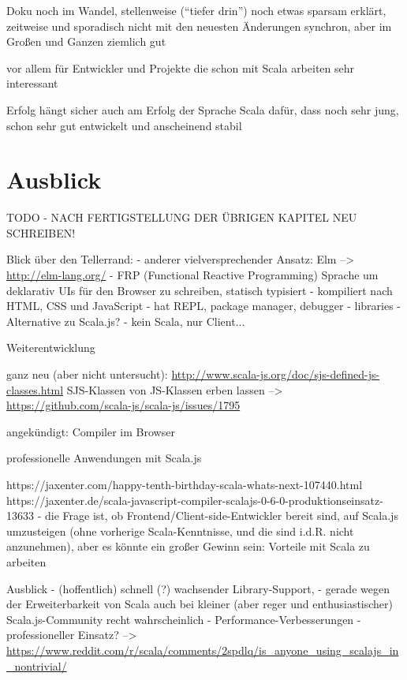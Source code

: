 \documentclass[a4paper, 12pt, hidelinks, listof=totoc, listoftables=totoc, bibliography=totoc]{scrreprt}
\begin{document}
Doku noch im Wandel, stellenweise ("`tiefer drin"') noch etwas sparsam erklärt, zeitweise und sporadisch nicht mit den neuesten Änderungen synchron, aber im Großen und Ganzen ziemlich gut

vor allem für Entwickler und Projekte die schon mit Scala arbeiten sehr interessant

Erfolg hängt sicher auch am Erfolg der Sprache Scala
dafür, dass noch sehr jung, schon sehr gut entwickelt und anscheinend stabil





\section{Ausblick}

TODO - NACH FERTIGSTELLUNG DER ÜBRIGEN KAPITEL NEU SCHREIBEN!

Blick über den Tellerrand:
- anderer vielversprechender Ansatz: Elm
	-->  \url{http://elm-lang.org/}
	- FRP (Functional Reactive Programming) Sprache um deklarativ UIs für den Browser zu schreiben, statisch typisiert
	- kompiliert nach HTML, CSS und JavaScript
	- hat REPL, package manager, debugger
	- libraries
	- Alternative zu Scala.js? - kein Scala, nur Client...



Weiterentwicklung

	ganz neu (aber nicht untersucht): \url{http://www.scala-js.org/doc/sjs-defined-js-classes.html}
	SJS-Klassen von JS-Klassen erben lassen  -->  \url{https://github.com/scala-js/scala-js/issues/1795}
	
	
	angekündigt: Compiler im Browser\cite{doeraene2014.WHB}
	



professionelle Anwendungen mit Scala.js

		https://jaxenter.com/happy-tenth-birthday-scala-whats-next-107440.html
	https://jaxenter.de/scala-javascript-compiler-scalajs-0-6-0-produktionseinsatz-13633
	- die Frage ist, ob Frontend/Client-side-Entwickler bereit sind, auf Scala.js umzusteigen (ohne vorherige Scala-Kenntnisse, und die sind i.d.R. nicht anzunehmen), aber es könnte ein großer Gewinn sein: Vorteile mit Scala zu arbeiten\cite{doeraene2013.CSJ}




Ausblick
  - (hoffentlich) schnell (?) wachsender Library-Support, 
     	- gerade wegen der Erweiterbarkeit von Scala auch bei kleiner (aber reger und enthusiastischer) Scala.js-Community  recht wahrscheinlich
  - Performance-Verbesserungen
  - professioneller Einsatz?
    -->  \url{https://www.reddit.com/r/scala/comments/2spdlq/is_anyone_using_scalajs_in_nontrivial/}
\end{document}
